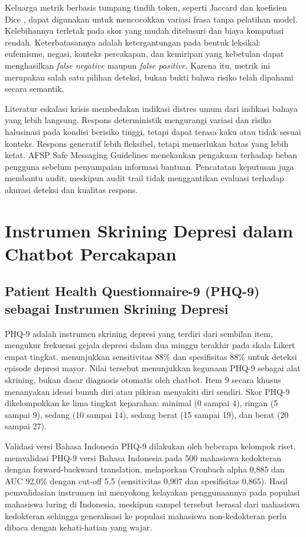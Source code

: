 Keluarga metrik berbasis tumpang tindih token, seperti Jaccard \parencite{niwattanakul2013jaccard} dan koefisien Dice \parencite{dice1945measures}, dapat digunakan untuk mencocokkan variasi frasa tanpa pelatihan model. Kelebihannya terletak pada skor yang mudah ditelusuri dan biaya komputasi rendah. Keterbatasannya adalah ketergantungan pada bentuk leksikal: eufemisme, negasi, konteks percakapan, dan kemiripan yang kebetulan dapat menghasilkan \textit{false negative} maupun \textit{false positive}. Karena itu, metrik ini merupakan salah satu pilihan deteksi, bukan bukti bahwa risiko telah dipahami secara semantik.

Literatur eskalasi krisis membedakan indikasi distres umum dari indikasi bahaya yang lebih langsung. Respons deterministik mengurangi variasi dan risiko halusinasi pada kondisi berisiko tinggi, tetapi dapat terasa kaku atau tidak sesuai konteks. Respons generatif lebih fleksibel, tetapi memerlukan batas yang lebih ketat. AFSP Safe Messaging Guidelines \parencite{afsp2023} menekankan pengakuan terhadap beban pengguna sebelum penyampaian informasi bantuan. Pencatatan keputusan juga membantu audit, meskipun audit trail tidak menggantikan evaluasi terhadap akurasi deteksi dan kualitas respons.

\section{Instrumen Skrining Depresi dalam Chatbot Percakapan}
\label{sec:phq9}

\subsection{Patient Health Questionnaire-9 (PHQ-9) sebagai Instrumen Skrining Depresi}
\label{subsec:phq9-instrumen}

PHQ-9 adalah instrumen skrining depresi yang terdiri dari sembilan item, mengukur frekuensi gejala depresi dalam dua minggu terakhir pada skala Likert empat tingkat. \textcite{kroenke2001phq9} menunjukkan sensitivitas 88\% dan spesifisitas 88\% untuk deteksi episode depresi mayor. Nilai tersebut menunjukkan kegunaan PHQ-9 sebagai alat skrining, bukan dasar diagnosis otomatis oleh chatbot. Item 9 secara khusus menanyakan ideasi bunuh diri atau pikiran menyakiti diri sendiri. Skor PHQ-9 dikelompokkan ke lima tingkat keparahan: minimal (0 sampai 4), ringan (5 sampai 9), sedang (10 sampai 14), sedang berat (15 sampai 19), dan berat (20 sampai 27).

Validasi versi Bahasa Indonesia PHQ-9 dilakukan oleh beberapa kelompok riset. \textcite{yulia2022phq9indo} memvalidasi PHQ-9 versi Bahasa Indonesia pada 500 mahasiswa kedokteran dengan forward-backward translation, melaporkan Cronbach alpha 0,885 dan AUC 92,0\% dengan cut-off 5,5 (sensitivitas 0,907 dan spesifisitas 0,865). Hasil pemvalidasian instrumen ini menyokong kelayakan penggunaannya pada populasi mahasiswa luring di Indonesia, meskipun sampel tersebut berasal dari mahasiswa kedokteran sehingga generalisasi ke populasi mahasiswa non-kedokteran perlu dibaca dengan kehati-hatian yang wajar.

